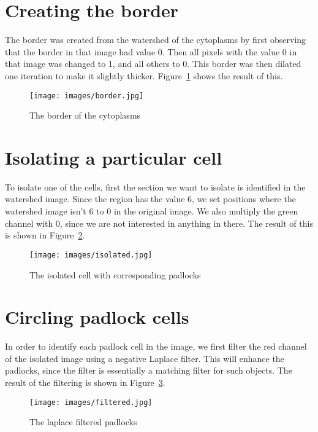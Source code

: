 \documentclass[twocolumn]{article}
\begin{document}
\section{Creating the border}

The border was created from the watershed of the cytoplasms by first observing
that the border in that image had value 0. Then all pixels with the value 0 in
that image was changed to 1, and all others to 0. This border was then dilated
one iteration to make it slightly thicker. Figure~\ref{fig:border} shows the
result of this.

\begin{figure}[h!]
    \centering
    \texttt{[image: images/border.jpg]}
    \caption{The border of the cytoplasms}
    \label{fig:border}
\end{figure}

\section{Isolating a particular cell}

To isolate one of the cells, first the section we want to isolate is identified
in the watershed image. Since the region has the value 6, we set positions
where the watershed image isn't 6 to 0 in the original image. We also multiply
the green channel with 0, since we are not interested in anything in there. The
result of this is shown in Figure~\ref{fig:isolated}.

\begin{figure}[h!]
    \centering
    \texttt{[image: images/isolated.jpg]}
    \caption{The isolated cell with corresponding padlocks}
    \label{fig:isolated}
\end{figure}

\section{Circling padlock cells}

In order to identify each padlock cell in the image, we first filter the red
channel of the isolated image using a negative Laplace filter. This will 
enhance the padlocks, since the filter is essentially a matching filter for 
such objects. The result of the filtering is shown in
Figure~\ref{fig:filtered}.

\begin{figure}[h!]
    \centering
    \texttt{[image: images/filtered.jpg]}
    \caption{The laplace filtered padlocks}
    \label{fig:filtered}
\end{figure}
\end{document}
